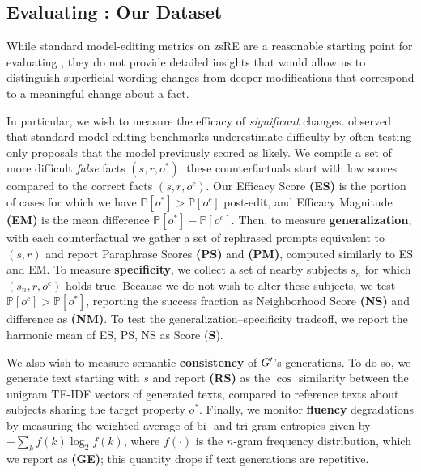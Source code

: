 \subsection{Evaluating \method: Our \cfd Dataset} %
\label{subsec:counterfact-description}

While standard model-editing metrics on zsRE are a reasonable starting point for evaluating \method, they do not provide detailed insights that would allow us to distinguish superficial wording changes from deeper modifications that correspond to a meaningful change about a fact.

In particular, we wish to measure the efficacy of \textit{significant} changes.  \cite{hase2021language} observed that standard model-editing benchmarks underestimate difficulty by often testing only proposals that the model previously scored as likely.  We compile a set of more difficult \textit{false} facts $(s, r, o^*)$: these counterfactuals start with low scores compared to the correct facts $(s, r, o^c)$.
Our Efficacy Score \textbf{(ES)} is the portion of cases for which we have $\mathbb{P}[o^*] > \mathbb{P}[o^c]$  post-edit, and Efficacy Magnitude \textbf{(EM)} is the mean difference $\mathbb{P}[o^*] - \mathbb{P}[o^c]$. Then, to measure \textbf{generalization}, with each counterfactual we gather a set of rephrased prompts equivalent to $(s, r)$ and report Paraphrase Scores \textbf{(PS)} and \textbf{(PM)}, computed similarly to ES and EM. To measure \textbf{specificity}, we collect a set of nearby subjects $s_n$ for which $(s_n, r, o^c)$ holds true. Because we do not wish to alter these subjects, we test $\mathbb{P}[o^c] > \mathbb{P}[o^*]$, reporting the success fraction as Neighborhood Score \textbf{(NS)} and difference as \textbf{(NM)}. To test the generalization--specificity tradeoff, we report the harmonic mean of ES, PS, NS as Score (\textbf{S}).


We also wish to measure semantic \textbf{consistency} of $G^\prime$'s generations. To do so, we generate text starting with $s$ and report \textbf{(RS)} as the $\cos$ similarity between the unigram TF-IDF vectors of generated texts, compared to reference texts about subjects sharing the target property $o^*$.  Finally, we monitor \textbf{fluency} degradations by measuring the weighted average of bi- and tri-gram entropies \citep{Zhang2018GeneratingIA} given by $-\sum_k f(k) \log_2 f(k)$, where $f(\cdot)$ is the $n$-gram frequency distribution, which we report as \textbf{(GE)}; this quantity drops if text generations are repetitive.



